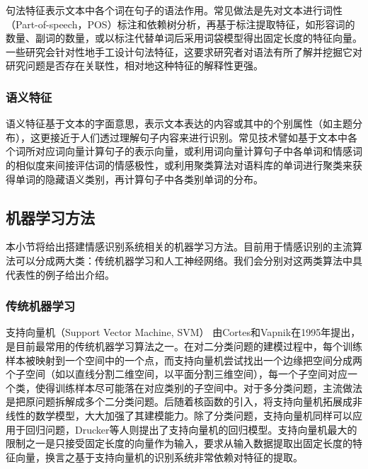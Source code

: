 句法特征表示文本中各个词在句子的语法作用。常见做法是先对文本进行词性（Part-of-speech，POS）标注和依赖树分析，再基于标注提取特征，如形容词的数量、副词的数量，或以标注代替单词后采用词袋模型得出固定长度的特征向量。一些研究会针对性地手工设计句法特征，这要求研究者对语法有所了解并挖掘它对研究问题是否存在关联性，相对地这种特征的解释性更强。

\subsubsection{语义特征} %

语义特征基于文本的字面意思，表示文本表达的内容或其中的个别属性‌（如主题分布），这更接近于人们透过理解句子内容来进行识别。常见技术譬如基于文本中各个词所对应词向量计算句子的表示向量，或利用词向量计算句子中各单词和情感词的相似度来间接评估词的情感极性，或利用聚类算法对语料库的单词进行聚类来获得单词的隐藏语义类别，再计算句子中各类别单词的分布。

\subsection{机器学习方法}
\label{ssec:model}

本小节将给出搭建情感识别系统相关的机器学习方法。目前用于情感识别的主流算法可以分成两大类：传统机器学习和人工神经网络。我们会分别对这两类算法中具代表性的例子给出介绍。

\subsubsection{传统机器学习}
\label{sssec:traditional_ml}

支持向量机（Support Vector Machine, SVM）\cite{cortes1995support} 由Cortes和Vapnik在1995年提出，是目前最常用的传统机器学习算法之一。在对二分类问题的建模过程中，每个训练样本被映射到一个空间中的一个点，而支持向量机尝试找出一个边缘把空间分成两个子空间（如以直线分割二维空间，以平面分割三维空间），每一个子空间对应一个类，使得训练样本尽可能落在对应类别的子空间中。对于多分类问题，主流做法是把原问题拆解成多个二分类问题。后随着核函数的引入，将支持向量机拓展成非线性的数学模型，大大加强了其建模能力。除了分类问题，支持向量机同样可以应用于回归问题，Drucker等人\cite{drucker1997support}则提出了支持向量机的回归模型。支持向量机最大的限制之一是只接受固定长度的向量作为输入，要求从输入数据提取出固定长度的特征向量，换言之基于支持向量机的识别系统非常依赖对特征的提取。

